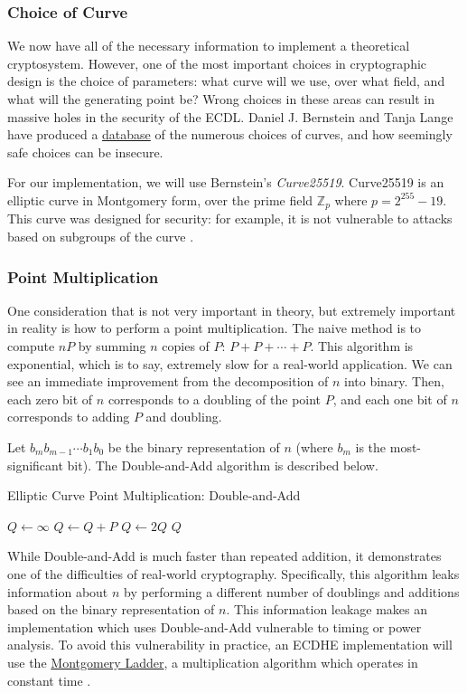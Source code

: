 \documentclass{article}
\begin{document}
\subsubsection{Choice of Curve}
We now have all of the necessary information to implement a theoretical cryptosystem.
However, one of the most important choices in cryptographic design is the choice of parameters: what curve will we use, over what field, and what will the generating point be?
Wrong choices in these areas can result in massive holes in the security of the ECDL.
Daniel J. Bernstein and Tanja Lange have produced a \href{http://safecurves.cr.yp.to/}{database} of the numerous choices of curves, and how seemingly safe choices can be insecure.

For our implementation, we will use Bernstein's \textit{Curve25519}.
Curve25519 is an elliptic curve in Montgomery form, over the prime field $\mathbb{Z}_p$ where $p = 2^{255} - 19$.
This curve was designed for security: for example, it is not vulnerable to attacks based on subgroups of the curve \cite{curve25519}.

\subsubsection{Point Multiplication}
One consideration that is not very important in theory, but extremely important in reality is how to perform a point multiplication.
The naive method is to compute $nP$ by summing $n$ copies of $P$: $P + P + \cdots + P$.
This algorithm is exponential, which is to say, extremely slow for a real-world application.
We can see an immediate improvement from the decomposition of $n$ into binary.
Then, each zero bit of $n$ corresponds to a doubling of the point $P$, and each one bit of $n$ corresponds to adding $P$ and doubling.

Let $b_m b_{m-1} \cdots b_1 b_0$ be the binary representation of $n$ (where $b_m$ is the most-significant bit).
The Double-and-Add algorithm is described below.
\begin{algorithm}
\caption{Elliptic Curve Point Multiplication: Double-and-Add}
\begin{algorithmic}
\State $Q \gets \infty$
		\State $Q \gets Q + P$
	\EndIf
	\State $Q \gets 2Q$
\EndFor
\State \Return $Q$
\end{algorithmic}
\end{algorithm}

While Double-and-Add is much faster than repeated addition, it demonstrates one of the difficulties of real-world cryptography.
Specifically, this algorithm leaks information about $n$ by performing a different number of doublings and additions based on the binary representation of $n$.
This information leakage makes an implementation which uses Double-and-Add vulnerable to timing or power analysis.
To avoid this vulnerability in practice, an ECDHE implementation will use the \href{http://safecurves.cr.yp.to/ladder.html}{Montgomery Ladder}, a multiplication algorithm which operates in constant time \cite[\S 3.3]{ecc-guide}. 
\end{document}
